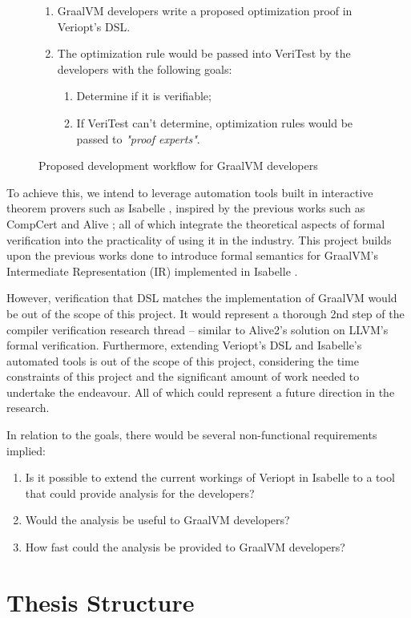 \begin{figure}[h]
    \begin{enumerate}
        \item GraalVM developers write a proposed optimization proof in Veriopt's DSL.
        \item The optimization rule would be passed into VeriTest by the developers with the following goals:

              \begin{enumerate}
                \item Determine if it is verifiable;
                \item If VeriTest can't determine, optimization rules would be passed to \emph{"proof experts"}.
              \end{enumerate}
    \end{enumerate}
    \caption{Proposed development workflow for GraalVM developers}
    \label{fig:toolGoals}
\end{figure}

To achieve this, we intend to leverage automation tools built in interactive theorem provers such as Isabelle \cite{IsabelleHOL}, inspired by the 
previous works such as CompCert \cite{compcertVerification} and Alive \cite{AliveInLean,Alive2}; all of which integrate the theoretical aspects of 
formal verification into the practicality of using it in the industry. This project builds upon the previous works done to introduce formal semantics 
for GraalVM's \cite{graal} Intermediate Representation (IR) \cite{ATVA21_GraalVM_IR_Semantics, Term_Graph_Optimizations} implemented in 
Isabelle \cite{IsabelleHOL}.

However, verification that DSL matches the implementation of GraalVM would be out of the scope of this project. It would represent a thorough 
2nd step of the compiler verification research thread \cite[p. 5]{CompilerOptimization} -- similar to Alive2's \cite{Alive2} solution on 
LLVM's formal verification. Furthermore, extending Veriopt's DSL and Isabelle's 
automated tools is out of the scope of this project, considering the time constraints of this project and the significant amount of work needed to 
undertake the endeavour. All of which could represent a future direction in the research.

In relation to the goals, there would be several non-functional requirements implied:

\begin{enumerate}
    \item Is it possible to extend the current workings of Veriopt in Isabelle to a tool that could provide analysis for the developers?    
    \item Would the analysis be useful to GraalVM developers?
    \item How fast could the analysis be provided to GraalVM developers?
\end{enumerate}


\section{Thesis Structure}

